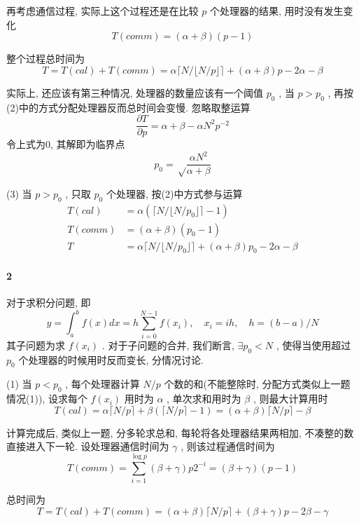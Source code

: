 \documentclass[a4paper, UTF8]{ctexart}				%
\numberwithin{equation}{section}				%
\begin{document}
        再考虑通信过程, 实际上这个过程还是在比较 $p$ 个处理器的结果, 用时没有发生变化
        \[
            T(comm) = (\alpha + \beta)(p-1)
        \]

        整个过程总时间为
        \[
            T = T(cal) + T(comm) = \alpha \lceil N/ \lfloor N/p \rfloor \rceil + (\alpha + \beta) p - 2\alpha - \beta
        \]

        实际上, 还应该有第三种情况, 处理器的数量应该有一个阈值 $p_0$ , 当 $p > p_0$ , 再按(2)中的方式分配处理器反而总时间会变慢. 忽略取整运算
        \[
            \frac{\partial T}{\partial p} = \alpha + \beta - \alpha N^2 p^{-2}
        \]
        令上式为0, 其解即为临界点 $$p_0 = \sqrt \frac{\alpha N^2}{\alpha + \beta}$$

        (3) 当 $p > p_0$ , 只取 $p_0$ 个处理器, 按(2)中方式参与运算 
        \[
            \begin{split}
                T(cal)     &= \alpha (\lceil N/ \lfloor N/p_0 \rfloor \rceil - 1)\\
                T(comm)    &= (\alpha + \beta)(p_0 - 1)\\
                T          &= \alpha \lceil N/ \lfloor N/p_0 \rfloor \rceil + (\alpha + \beta) p_0 - 2\alpha - \beta
        \end{split}  
        \]

    \paragraph{2}\quad 
        对于求积分问题, 即 
        \[
            y = \int_a^b f(x)dx = h\sum_{i=0}^{N-1} f(x_i),\quad x_i = ih,\quad h = (b-a)/N
        \]
        其子问题为求 $f(x_i)$ . 对于子问题的合并, 我们断言, $\exists p_0 < N$ , 使得当使用超过 $p_0$ 个处理器的时候用时反而变长, 分情况讨论.

        (1) 当 $p < p_0$ , 每个处理器计算 $N/p$ 个数的和(不能整除时, 分配方式类似上一题情况(1)), 设求每个 $f(x_i)$ 用时为 $\alpha$ , 单次求和用时为 $\beta$ , 则最大计算用时 
        \[
            T(cal) = \alpha \lceil N/p \rceil + \beta(\lceil N/p \rceil - 1) = (\alpha + \beta) \lceil N/p \rceil - \beta
        \]
        
        计算完成后, 类似上一题, 分多轮求总和, 每轮将各处理器结果两相加, 不凑整的数直接进入下一轮. 设处理器通信时间为 $\gamma$ , 则该过程通信时间为 
        \[
            T(comm) = \sum_{i=1}^{\log p} (\beta + \gamma) p 2^{-i} = (\beta + \gamma)(p-1)
        \]
        
        总时间为 
        \[
            T = T(cal) + T(comm) = (\alpha + \beta) \lceil N/p \rceil  + (\beta + \gamma)p - 2\beta - \gamma
        \]
        
\end{document}
